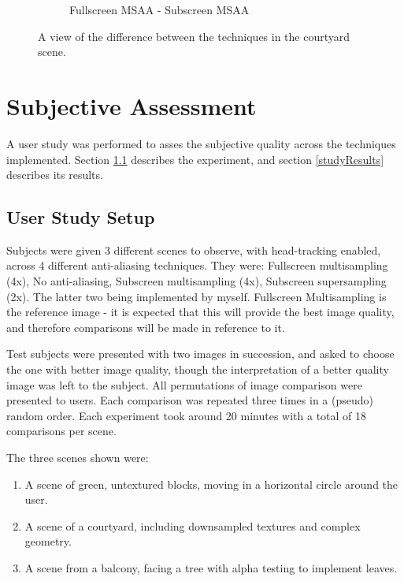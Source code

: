 \documentclass[12pt,a4paper,twoside,openright]{report}
\begin{document}
\begin{figure}[tbh]
\begin{subfigure}{0.5\textwidth}
\caption{Fullscreen MSAA - Subscreen MSAA}
\end{subfigure}
\caption{A view of the difference between the techniques in the courtyard scene.}
\end{figure}

\clearpage

\section{Subjective Assessment}
A user study was performed to asses the subjective quality across the techniques implemented. Section \ref{studySetup} describes the experiment, and section \ref{studyResults} describes its results.

\subsection{User Study Setup}\label{studySetup}

Subjects were given 3 different scenes to observe, with head-tracking enabled, across 4 different anti-aliasing techniques. They were: Fullscreen multisampling (4x), No anti-aliasing, Subscreen multisampling (4x), Subscreen supersampling (2x). The latter two being implemented by myself. Fullscreen Multisampling is the reference image - it is expected that this will provide the best image quality, and therefore comparisons will be made in reference to it.

Test subjects were presented with two images in succession, and asked to choose the one with better image quality, though the interpretation of a better quality image was left to the subject. All permutations of image comparison were presented to users. Each comparison was repeated three times in a (pseudo) random order. Each experiment took around 20 minutes with a total of 18 comparisons per scene.

The three scenes shown were:

\begin{enumerate}
\item A scene of green, untextured blocks, moving in a horizontal circle around the user.

\item A scene of a courtyard, including downsampled textures and complex geometry.

\item A scene from a balcony, facing a tree with alpha testing to implement leaves.
\end{enumerate}
\end{document}
